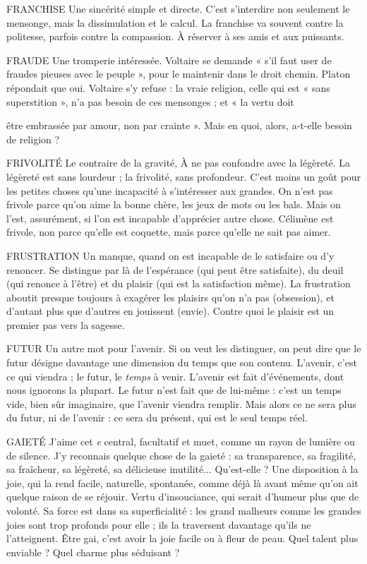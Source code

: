 FRANCHISE Une sincérité simple et directe. C’est s’interdire non seulement
le mensonge, mais la dissimulation et le calcul. La franchise
va souvent contre la politesse, parfois contre la compassion. À réserver à
ses amis et aux puissants.

FRAUDE Une tromperie intéressée. Voltaire se demande « s’il faut user de
fraudes pieuses avec le peuple », pour le maintenir dans le droit
chemin. Platon répondait que oui. Voltaire s’y refuse : la vraie religion, celle
qui est « sans superstition », n’a pas besoin de ces mensonges ; et « la vertu doit

être embrassée par amour, non par crainte ». Mais en quoi, alors, a-t-elle besoin
de religion ?

FRIVOLITÉ Le contraire de la gravité, À ne pas confondre avec la légèreté.
La légèreté est sans lourdeur ; la frivolité, sans profondeur.
C’est moins un goût pour les petites choses qu’une incapacité à s'intéresser aux
grandes. On n’est pas frivole parce qu’on aime la bonne chère, les jeux de mots
ou les bals. Mais on l’est, assurément, si l’on est incapable d’apprécier autre
chose. Célimène est frivole, non parce qu’elle est coquette, mais parce qu’elle
ne sait pas aimer.

FRUSTRATION Un manque, quand on est incapable de le satisfaire ou d’y
renoncer. Se distingue par là de l’espérance (qui peut être
satisfaite), du deuil (qui renonce à l'être) et du plaisir (qui est la satisfaction
même).
La frustration aboutit presque toujours à exagérer les plaisirs qu’on n’a pas
(obsession), et d’autant plus que d’autres en jouissent (envie). Contre quoi le
plaisir est un premier pas vers la sagesse.

FUTUR Un autre mot pour l'avenir. Si on veut les distinguer, on peut dire
que le futur désigne davantage une dimension du temps que son
contenu. L'avenir, c’est ce qui viendra ; le futur, le {\it temps} à venir. L'avenir est
fait d'événements, dont nous ignorons la plupart. Le futur n’est fait que de lui-même :
c’est un temps vide, bien sûr imaginaire, que l’avenir viendra remplir.
Mais alors ce ne sera plus du futur, ni de l’avenir : ce sera du présent, qui est le
seul temps réel.

GAIETÉ J'aime cet {\it e} central, facultatif et muet, comme un rayon de
lumière ou de silence. J’y reconnais quelque chose de la gaieté : sa
transparence, sa fragilité, sa fraîcheur, sa légèreté, sa délicieuse inutilité...
Qu’est-elle ? Une disposition à la joie, qui la rend facile, naturelle, spontanée,
comme déjà là avant même qu’on ait quelque raison de se réjouir. Vertu
d’insouciance, qui serait d’humeur plus que de volonté. Sa force est dans sa
superficialité : les grand malheurs comme les grandes joies sont trop profonds
pour elle ; ils la traversent davantage qu’ils ne l’atteignent. Être gai, c’est avoir
la joie facile ou à fleur de peau. Quel talent plus enviable ? Quel charme plus
séduisant ?

